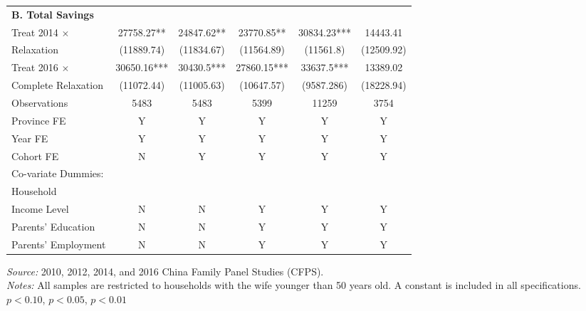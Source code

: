 \documentclass[12pt]{extarticle}
\begin{document}
\begin{table}
\begin{threeparttable}
\begin{tabular}{l*{5}{c}}
\textbf{B. Total Savings}\\
Treat 2014 $\times$ &    27758.27** &    24847.62** &    23770.85** &    30834.23***&    14443.41   \\
\quad 2014 Relaxation     &  (11889.74)   &  (11834.67)   &  (11564.89)   &   (11561.8)   &  (12509.92)   \\
Treat 2016 $\times$ &    30650.16***&     30430.5***&    27860.15***&     33637.5***&    13389.02   \\
\quad Complete Relaxation &  (11072.44)   &  (11005.63)   &  (10647.57)   &  (9587.286)   &  (18228.94)   \\
Observations        &        5483   &        5483   &        5399   &       11259   &        3754   \\
\hline
Province FE &  Y &  Y & Y & Y & Y \\
Year FE &  Y &  Y & Y & Y & Y \\
Cohort FE & N & Y & Y & Y & Y \\
Co-variate Dummies: \\
\quad Household \\
\qquad Income Level & N & N & Y & Y & Y \\
\quad Parents' Education &  N &  N & Y & Y & Y \\
\quad Parents' Employment &  N &  N & Y & Y & Y \\
\hline\hline
\end{tabular}
\begin{tablenotes}
\footnotesize \textit{Source:} 2010, 2012, 2014, and 2016 China Family Panel Studies (CFPS). \\
\textit{Notes:} All samples are restricted to households with the wife younger than 50 years old. A constant is included in all specifications. \\
\quad \sym{*} \(p<0.10\), \sym{**} \(p<0.05\), \sym{***} \(p<0.01\)
\end{tablenotes}
\end{threeparttable}
\end{table}
\end{document}
